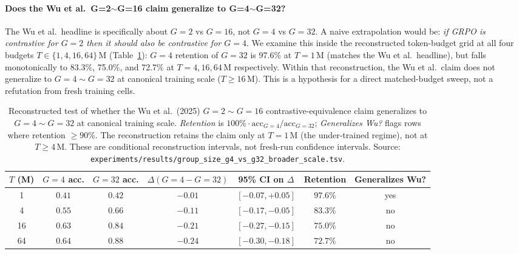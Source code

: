 \documentclass{article}
\begin{document}
\paragraph{Does the Wu et al.\ G=2$\sim$G=16 claim generalize to G=4$\sim$G=32?}
The Wu et al.\ headline is specifically about $G{=}2$ vs $G{=}16$, not
$G{=}4$ vs $G{=}32$. A naive extrapolation would be: \emph{if GRPO is
contrastive for $G{=}2$ then it should also be contrastive for
$G{=}4$}. We examine this inside the reconstructed token-budget grid at all four
budgets $T \in \{1, 4, 16, 64\}\,$M (Table~\ref{tab:groupsize-g4-g32}):
$G{=}4$ retention of $G{=}32$ is 97.6\% at $T{=}1\,$M (matches the Wu
et al.\ headline), but falls monotonically to 83.3\%, 75.0\%, and
72.7\% at $T{=}4, 16, 64\,$M respectively. Within that reconstruction,
the Wu et al.\ claim does not generalize to $G{=}4 \sim G{=}32$ at
canonical training scale ($T \ge 16\,$M). This is a hypothesis for a
direct matched-budget sweep, not a refutation from fresh training cells.

\begin{table}[htbp]
\centering
\small
\begin{tabular}{ccccccc}
\toprule
$T$ (M) & $G{=}4$ acc. & $G{=}32$ acc. & $\Delta(G{=}4{-}G{=}32)$ & 95\% CI on $\Delta$ & Retention & Generalizes Wu? \\
\midrule
1  & $0.41$ & $0.42$ & $-0.01$ & $[-0.07, +0.05]$ & $\mathbf{97.6\%}$ & yes \\
4  & $0.55$ & $0.66$ & $-0.11$ & $[-0.17, -0.05]$ & $83.3\%$          & no  \\
16 & $0.63$ & $0.84$ & $-0.21$ & $[-0.27, -0.15]$ & $75.0\%$          & no  \\
64 & $0.64$ & $0.88$ & $-0.24$ & $[-0.30, -0.18]$ & $\mathbf{72.7\%}$ & no  \\
\bottomrule
\end{tabular}
\caption{Reconstructed test of whether the Wu et al.\ (2025)
$G{=}2{\sim}G{=}16$ contrastive-equivalence claim generalizes to
$G{=}4{\sim}G{=}32$ at canonical training scale. \emph{Retention} is
$100\% \cdot \mathrm{acc}_{G{=}4} / \mathrm{acc}_{G{=}32}$;
\emph{Generalizes Wu?} flags rows where retention $\ge 90\%$. The
reconstruction retains the claim only at $T{=}1\,$M (the under-trained
regime), not at $T \ge 4\,$M. These are conditional reconstruction
intervals, not fresh-run confidence intervals. Source:
\texttt{experiments/results/group\_size\_g4\_vs\_g32\_broader\_scale.tsv}.}
\label{tab:groupsize-g4-g32}
\end{table}
\end{document}
